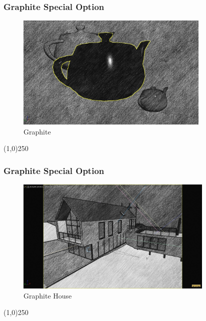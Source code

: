 \begin{frame}
\frametitle{Graphite Special Option}
\begin{figure}
	\centering
	\includegraphics[height=5.5cm]{img/ViewportOptions/Graphite.jpg}
	\caption{Graphite}
	\label{fig:GraphiteOption}
\end{figure}
\end{frame}
\begin{center}\line(1,0){250}\end{center}



\begin{frame}
\frametitle{Graphite Special Option}
\begin{figure}
	\centering
	\includegraphics[height=5.5cm]{img/ViewportOptions/GraphiteHouse.jpg}
	\caption{Graphite House}
	\label{fig:GraphiteHouseOption}
\end{figure}
\end{frame}
\begin{center}\line(1,0){250}\end{center}



